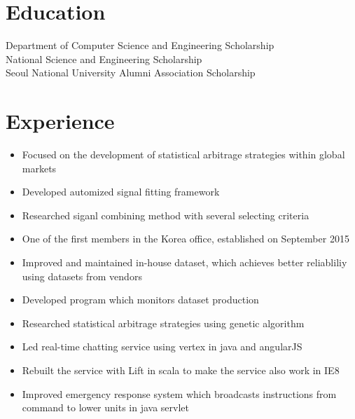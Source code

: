 \documentclass[11pt,a4paper,sans]{moderncv}        %
\begin{document}
\makecvtitle%
\vspace*{-10mm}

\section{Education}
{Department of Computer Science and Engineering Scholarship\\
National Science and Engineering Scholarship\\
Seoul National University Alumni Association Scholarship}

\section{Experience}
{\begin{itemize}%
    \item Focused on the development of statistical arbitrage strategies within global markets
    \item Developed automized signal fitting framework
    \item Researched siganl combining method with several selecting criteria
\end{itemize}}

{\begin{itemize}%
    \item One of the first members in the Korea office, established on September 2015
    \item Improved and maintained in-house dataset, which achieves better reliabliliy using datasets from vendors
    \item Developed program which monitors dataset production
    \item Researched statistical arbitrage strategies using genetic algorithm
\end{itemize}}

{\begin{itemize}%
    \item Led real-time chatting service using vertex in java and angularJS
    \item Rebuilt the service with Lift in scala to make the service also work in IE8
    \item Improved emergency response system which broadcasts instructions from command to lower units in java servlet
\end{itemize}}
\end{document}
